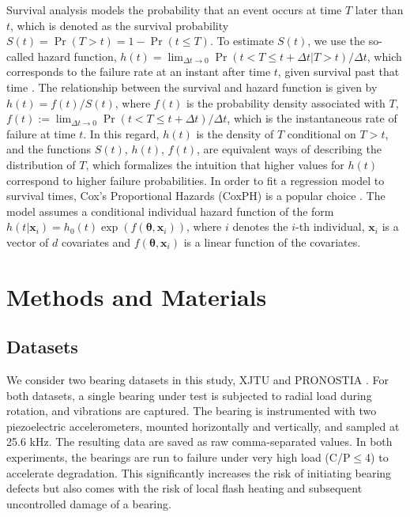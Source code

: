 \documentclass[letterpaper]{article} %
\begin{document}
Survival analysis models the probability that an event occurs at time $T$ later than $t$, which is denoted as the survival probability $S(t) = \Pr(T>t) = 1-\Pr(t\leq T)$. To estimate $S(t)$, we use the so-called hazard function, $h(t) = \lim_{\Delta t \rightarrow 0} \Pr(t<T\leq t+ \Delta t \vert T>t)/\Delta t$, which corresponds to the failure rate at an instant after time $t$, given survival past that time \cite{gareth_introduction_2021}. The relationship between the survival and hazard function is given by $h(t) = f(t)/S(t)$, where $f(t)$ is the probability density associated with $T$, $f(t) := \lim_{\Delta t \rightarrow 0} \Pr(t<T\leq t+\Delta t)/\Delta t $, which is the instantaneous rate of failure at time $t$. In this regard, $h(t)$ is the density of $T$ conditional on $T>t$, and the functions $S(t)$, $h(t)$, $f(t)$, are equivalent ways of describing the distribution of $T$,  which formalizes the intuition that higher values for $h(t)$ correspond to higher failure probabilities. In order to fit a regression model to survival times, Cox's Proportional Hazards (CoxPH) is a popular choice \cite{cox_regression_1972}. The model assumes a conditional individual hazard function of the form $h(t\vert \bm{x}_i) = h_0(t) \exp (f(\bm{\theta},\bm{x}_i))$, where $i$ denotes the $i$-th individual, $\bm{x}_i$ is a vector of $d$ covariates and $f(\bm{\theta},\bm{x}_i)$ is a linear function of the covariates.

\section{Methods and Materials}

\subsection{Datasets}

We consider two bearing datasets in this study, XJTU \cite{wang_hybrid_2020} and PRONOSTIA \cite{nectoux_pronostia_2012}. For both datasets, a single bearing under test is subjected to radial load during rotation, and vibrations are captured. The bearing is instrumented with two piezoelectric accelerometers, mounted horizontally and vertically, and sampled at 25.6 kHz. The resulting data are saved as raw comma-separated values. In both experiments, the bearings are run to failure under very high load (C/P$\leq$4) to accelerate degradation. This significantly increases the risk of initiating bearing defects but also comes with the risk of local flash heating and subsequent uncontrolled damage of a bearing.
\end{document}
